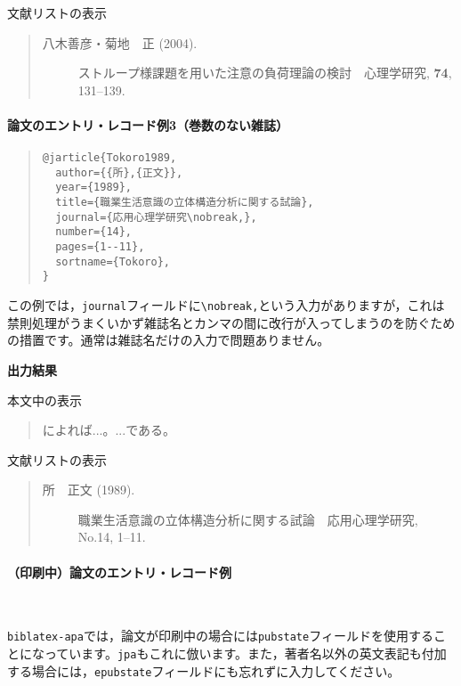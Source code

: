 \documentclass[12pt]{ltjsarticle}
\begin{document}
文献リストの表示
\begin{quote}
\begin{description}
  \item[\textrm{八木善彦・菊地　正 (2004).}]ストループ様課題を用いた注意の負荷理論の検討　心理学研究, \textbf{74}, 131--139.
\end{description}
\end{quote}

\paragraph{論文のエントリ・レコード例3（巻数のない雑誌）}

\begin{quote}
\begin{verbatim}
@jarticle{Tokoro1989,
  author={{所},{正文}},
  year={1989},
  title={職業生活意識の立体構造分析に関する試論},
  journal={応用心理学研究\nobreak,},
  number={14},
  pages={1--11},
  sortname={Tokoro},
}
\end{verbatim}
\end{quote}

この例では，\texttt{journal}フィールドに\texttt{\textbackslash nobreak,}という入力がありますが，これは禁則処理がうまくいかず雑誌名とカンマの間に改行が入ってしまうのを防ぐための措置です。通常は雑誌名だけの入力で問題ありません。

\textbf{出力結果}

本文中の表示
\begin{quote}
\textcite{Tokoro1989}によれば...。...である\parencite{Tokoro1989}。
\end{quote}


文献リストの表示
\begin{quote}
\begin{description}
  \item[\textrm{所　正文 (1989).}]職業生活意識の立体構造分析に関する試論　応用心理学研究, No.14, 1--11.
\end{description}
\end{quote}


\paragraph{（印刷中）論文のエントリ・レコード例}　


\texttt{biblatex-apa}では，論文が印刷中の場合には\texttt{pubstate}フィールドを使用することになっています。\texttt{jpa}もこれに倣います。また，著者名以外の英文表記も付加する場合には，\texttt{epubstate}フィールドにも忘れずに入力してください。
\end{document}
